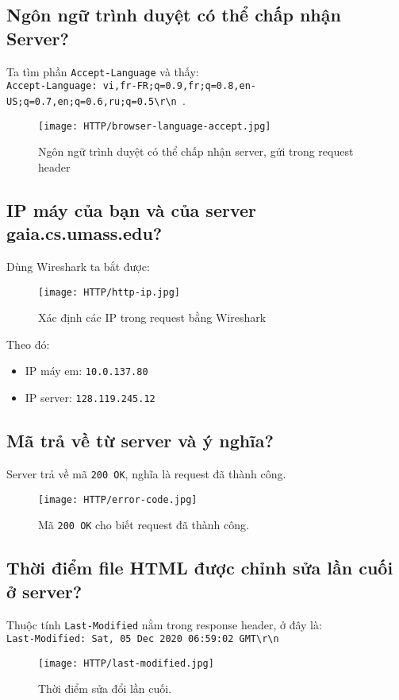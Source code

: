 \documentclass[]{article}
\begin{document}
\subsection{Ngôn ngữ trình duyệt có thể chấp nhận Server?}
Ta tìm phần \texttt{Accept-Language}\cite{MSDN-Language} và thấy:
\\
\texttt{Accept-Language: vi,fr-FR;q=0.9,fr;q=0.8,en-US;q=0.7,en;q=0.6,ru;q=0.5\textbackslash r\textbackslash n }.
\begin{figure}[H]
\centering
\texttt{[image: HTTP/browser-language-accept.jpg]}
\caption{Ngôn ngữ trình duyệt có thể chấp nhận server, gửi trong request header}
\end{figure}

\subsection{IP máy của bạn và của server gaia.cs.umass.edu?}
Dùng Wireshark ta bắt được:
\begin{figure}[H]
\centering
\texttt{[image: HTTP/http-ip.jpg]}
\caption{Xác định các IP trong request bằng Wireshark}
\end{figure}

Theo đó:
\begin{itemize}
\item IP máy em: \texttt{10.0.137.80}
\item IP server: \texttt{128.119.245.12}
\end{itemize}

\subsection{Mã trả về từ server và ý nghĩa?}
Server trả về mã \texttt{200 OK}, nghĩa là request đã thành công.\cite{MSDN-200}
\begin{figure}[H]
\centering
\texttt{[image: HTTP/error-code.jpg]}
\caption{Mã \texttt{200 OK} cho biết request đã thành công.}
\end{figure}

\subsection{Thời điểm file HTML được chỉnh sửa lần cuối ở server?}
Thuộc tính \texttt{Last-Modified}\cite{MSDN-lastmod} nằm trong response header, ở đây là:
\\
\texttt{Last-Modified: Sat, 05 Dec 2020 06:59:02 GMT\textbackslash r\textbackslash n}
\begin{figure}[H]
\centering
\texttt{[image: HTTP/last-modified.jpg]}
\caption{Thời điểm sửa đổi lần cuối.}
\end{figure}
\end{document}

